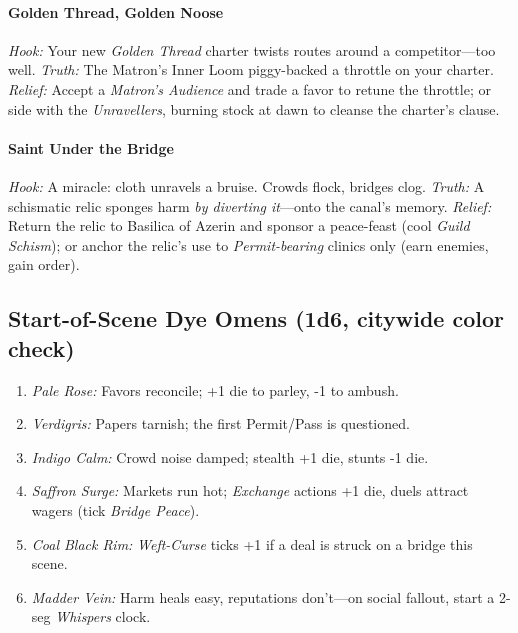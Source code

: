 \paragraph{Golden Thread, Golden Noose}
\emph{Hook:} Your new \emph{Golden Thread} charter twists routes around a competitor—too well.  
\emph{Truth:} The Matron’s Inner Loom piggy-backed a throttle on your charter.  
\emph{Relief:} Accept a \emph{Matron’s Audience} and trade a favor to retune the throttle; or side with the \emph{Unravellers}, burning stock at dawn to cleanse the charter’s clause.

\paragraph{Saint Under the Bridge}
\emph{Hook:} A miracle: cloth unravels a bruise. Crowds flock, bridges clog.  
\emph{Truth:} A schismatic relic sponges harm \emph{by diverting it}—onto the canal’s memory.  
\emph{Relief:} Return the relic to Basilica of Azerin and sponsor a peace-feast (cool \emph{Guild Schism}); or anchor the relic’s use to \emph{Permit-bearing} clinics only (earn enemies, gain order).

\subsection*{Start-of-Scene Dye Omens (1d6, citywide color check)}
\begin{enumerate}
  \item \emph{Pale Rose:} Favors reconcile; +1 die to parley, -1 to ambush.  
  \item \emph{Verdigris:} Papers tarnish; the first Permit/Pass is questioned.  
  \item \emph{Indigo Calm:} Crowd noise damped; stealth +1 die, stunts -1 die.  
  \item \emph{Saffron Surge:} Markets run hot; \emph{Exchange} actions +1 die, duels attract wagers (tick \emph{Bridge Peace}).  
  \item \emph{Coal Black Rim:} \emph{Weft-Curse} ticks +1 if a deal is struck on a bridge this scene.  
  \item \emph{Madder Vein:} Harm heals easy, reputations don’t—on social fallout, start a 2-seg \emph{Whispers} clock.
\end{enumerate}


